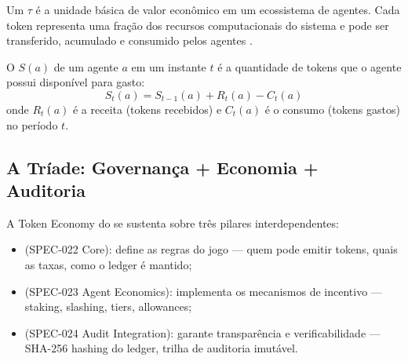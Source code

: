 \begin{table}[htb]
\centering
    \small
\caption{Economia humana vs. economia de agentes}
\label{tab:economia-humana-agentes}
\end{table}

\begin{definicao}[Token]
Um  $\tau$ é a unidade básica de valor econômico
em um ecossistema de agentes. Cada token representa uma fração
dos recursos computacionais do sistema e pode ser transferido,
acumulado e consumido pelos agentes \cite{opencode2026token}.
\end{definicao}

\begin{definicao}
O  $S(a)$ de um agente $a$ em um instante $t$ é
a quantidade de tokens que o agente possui disponível para gasto:
\[
S_t(a) = S_{t-1}(a) + R_t(a) - C_t(a)
\]
onde $R_t(a)$ é a receita (tokens recebidos) e $C_t(a)$ é o
consumo (tokens gastos) no período $t$.
\end{definicao}

\subsection{A Tríade: Governança + Economia + Auditoria}

A Token Economy do \opencodeeco{} se sustenta sobre três pilares
interdependentes:

\begin{itemize}
\item {} (SPEC-022 Core): define as regras do
jogo — quem pode emitir tokens, quais as taxas, como o ledger é
mantido;
\item {} (SPEC-023 Agent Economics): implementa
os mecanismos de incentivo — staking, slashing, tiers, allowances;
\item {} (SPEC-024 Audit Integration): garante
transparência e verificabilidade — SHA-256 hashing do ledger,
trilha de auditoria imutável.
\end{itemize}

